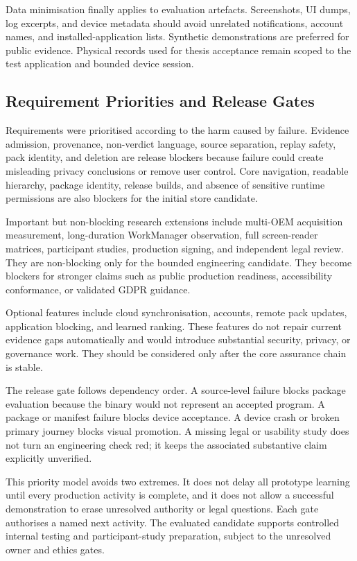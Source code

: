 Data minimisation finally applies to evaluation artefacts. Screenshots, UI dumps, log excerpts, and device metadata should avoid unrelated notifications, account names, and installed-application lists. Synthetic demonstrations are preferred for public evidence. Physical records used for thesis acceptance remain scoped to the test application and bounded device session.

\subsection{Requirement Priorities and Release Gates}

Requirements were prioritised according to the harm caused by failure. Evidence admission, provenance, non-verdict language, source separation, replay safety, pack identity, and deletion are release blockers because failure could create misleading privacy conclusions or remove user control. Core navigation, readable hierarchy, package identity, release builds, and absence of sensitive runtime permissions are also blockers for the initial store candidate.

Important but non-blocking research extensions include multi-OEM acquisition measurement, long-duration WorkManager observation, full screen-reader matrices, participant studies, production signing, and independent legal review. They are non-blocking only for the bounded engineering candidate. They become blockers for stronger claims such as public production readiness, accessibility conformance, or validated GDPR guidance.

Optional features include cloud synchronisation, accounts, remote pack updates, application blocking, and learned ranking. These features do not repair current evidence gaps automatically and would introduce substantial security, privacy, or governance work. They should be considered only after the core assurance chain is stable.

The release gate follows dependency order. A source-level failure blocks package evaluation because the binary would not represent an accepted program. A package or manifest failure blocks device acceptance. A device crash or broken primary journey blocks visual promotion. A missing legal or usability study does not turn an engineering check red; it keeps the associated substantive claim explicitly unverified.

This priority model avoids two extremes. It does not delay all prototype learning until every production activity is complete, and it does not allow a successful demonstration to erase unresolved authority or legal questions. Each gate authorises a named next activity. The evaluated candidate supports controlled internal testing and participant-study preparation, subject to the unresolved owner and ethics gates.

